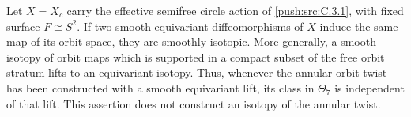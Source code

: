 \begin{proposition}\label{push:src:C.3.6}
Let \(X=X_c\) carry the effective semifree circle action of \ref{push:src:C.3.1},
with fixed surface \(F\cong S^2\). If two smooth equivariant
diffeomorphisms of \(X\) induce the same map of its orbit space,
they are smoothly isotopic. More generally, a smooth isotopy of
orbit maps which is supported in a compact subset of the free
orbit stratum lifts to an equivariant isotopy. Thus, whenever the
annular orbit twist has been constructed with a smooth equivariant
lift, its class in \(\Theta_7\) is independent of that lift.
This assertion does not construct an isotopy of the annular twist.
\end{proposition}


